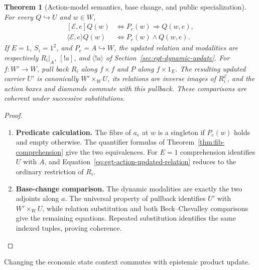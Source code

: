 \documentclass[11pt,a4paper]{article}
\numberwithin{equation}{section}
\newtheorem{theorem}{Theorem}[section]
\theoremstyle{definition}
\theoremstyle{remark}
\theoremstyle{plain}
\begin{document}
\begin{theorem}[Action-model semantics, base change, and public specialization]
\label{thm:egt-action-model-semantics}
For every $Q\hookrightarrow U$ and $w\in W$,
\[
 \begin{aligned}
 [\mathcal E,e]Q(w)&\Longleftrightarrow P_e(w)\Rightarrow Q(w,e),\\
 \langle\mathcal E,e\rangle Q(w)&\Longleftrightarrow
                                      P_e(w)\wedge Q(w,e).
 \end{aligned}
\]
If $E=1$, $S_i=1^2$, and $P_e=A\hookrightarrow W$, the updated
relation and modalities are respectively $R_i|_A$, $[!a]$, and
$\langle!a\rangle$ of Section~\ref{sec:egt-dynamic-update}.
For $f:W'\to W$, pull back $R_i$ along $f\times f$ and $P$ along
$f\times1_E$. The resulting updated carrier $U'$ is canonically
$W'\times_WU$, its relations are inverse images of
$R_i^{\mathcal E}$, and the action boxes and diamonds commute with
this pullback. These comparisons are coherent under successive
substitutions.
\end{theorem}
\begin{proof}
\leavevmode
\begin{enumerate}[label=\textup{(\arabic*)},leftmargin=*,itemsep=4pt,topsep=3pt]
  \item \textbf{Predicate calculation.} The fibre of $a_e$ at $w$ is a singleton if $P_e(w)$ holds and empty
otherwise. The quantifier formulas of
Theorem~\ref{thm:fib-comprehension} give the two equivalences. For $E=1$ comprehension identifies $U$ with $A$, and
Equation~\eqref{eq:egt-action-updated-relation} reduces to the ordinary
restriction of $R_i$.
  \item \textbf{Base-change comparison.} The dynamic modalities are exactly the two
adjoints along $a$. The universal property of pullback identifies
$U'$ with $W'\times_WU$, while relation substitution and both
Beck--Chevalley comparisons give the remaining equations. Repeated
substitution identifies the same indexed tuples, proving coherence.
\end{enumerate}
\end{proof}

\noindent Changing the economic state context commutes with epistemic product update.
\begin{center}
\end{center}
\end{document}
